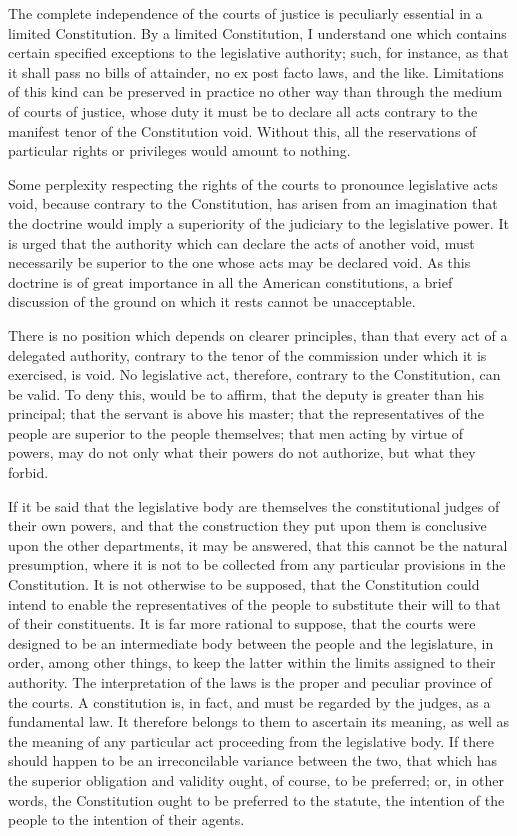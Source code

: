 The complete independence of the courts of justice is peculiarly essential in a limited Constitution. 
By a limited Constitution, I understand one which contains certain specified exceptions to the legislative authority; such, for instance, as that it shall pass no bills of attainder, no ex post facto laws, and the like. 
Limitations of this kind can be preserved in practice no other way than through the medium of courts of justice, whose duty it must be to declare all acts contrary to the manifest tenor of the Constitution void. 
Without this, all the reservations of particular rights or privileges would amount to nothing.

Some perplexity respecting the rights of the courts to pronounce legislative acts void, because contrary to the Constitution, has arisen from an imagination that the doctrine would imply a superiority of the judiciary to the legislative power. 
It is urged that the authority which can declare the acts of another void, must necessarily be superior to the one whose acts may be declared void. 
As this doctrine is of great importance in all the American constitutions, a brief discussion of the ground on which it rests cannot be unacceptable.

There is no position which depends on clearer principles, than that every act of a delegated authority, contrary to the tenor of the commission under which it is exercised, is void. 
No legislative act, therefore, contrary to the Constitution, can be valid. 
To deny this, would be to affirm, that the deputy is greater than his principal; that the servant is above his master; that the representatives of the people are superior to the people themselves; that men acting by virtue of powers, may do not only what their powers do not authorize, but what they forbid.

If it be said that the legislative body are themselves the constitutional judges of their own powers, and that the construction they put upon them is conclusive upon the other departments, it may be answered, that this cannot be the natural presumption, where it is not to be collected from any particular provisions in the Constitution. 
It is not otherwise to be supposed, that the Constitution could intend to enable the representatives of the people to substitute their will to that of their constituents. 
It is far more rational to suppose, that the courts were designed to be an intermediate body between the people and the legislature, in order, among other things, to keep the latter within the limits assigned to their authority. 
The interpretation of the laws is the proper and peculiar province of the courts. 
A constitution is, in fact, and must be regarded by the judges, as a fundamental law. 
It therefore belongs to them to ascertain its meaning, as well as the meaning of any particular act proceeding from the legislative body. 
If there should happen to be an irreconcilable variance between the two, that which has the superior obligation and validity ought, of course, to be preferred; or, in other words, the Constitution ought to be preferred to the statute, the intention of the people to the intention of their agents.

